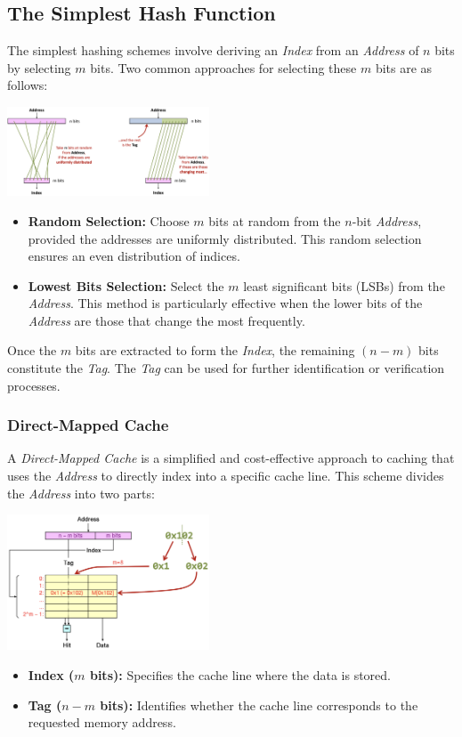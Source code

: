 \subsection{The Simplest Hash Function}
The simplest hashing schemes involve deriving an \textit{Index} from an \textit{Address} of $n$ bits by selecting $m$ bits. Two common approaches for selecting these $m$ bits are as follows:
\begin{center}
    \includegraphics[width=0.45\textwidth]{chapters/chapter3a/images/hash.png}
\end{center}
\begin{itemize}
    \item \textbf{Random Selection:} Choose $m$ bits at random from the $n$-bit \textit{Address}, provided the addresses are uniformly distributed. This random selection ensures an even distribution of indices.
    
    \item \textbf{Lowest Bits Selection:} Select the $m$ least significant bits (LSBs) from the \textit{Address}. This method is particularly effective when the lower bits of the \textit{Address} are those that change the most frequently.
\end{itemize}

Once the $m$ bits are extracted to form the \textit{Index}, the remaining $(n-m)$ bits constitute the \textit{Tag}. The \textit{Tag} can be used for further identification or verification processes.

\subsubsection{Direct-Mapped Cache}
A \textit{Direct-Mapped Cache} is a simplified and cost-effective approach to caching that uses the \textit{Address} to directly index into a specific cache line. This scheme divides the \textit{Address} into two parts:
\begin{center}
    \includegraphics[width=0.45\textwidth]{chapters/chapter3a/images/dmc.png}
\end{center}
\begin{itemize}
    \item \textbf{Index ($m$ bits):} Specifies the cache line where the data is stored.
    \item \textbf{Tag ($n-m$ bits):} Identifies whether the cache line corresponds to the requested memory address.
\end{itemize}

